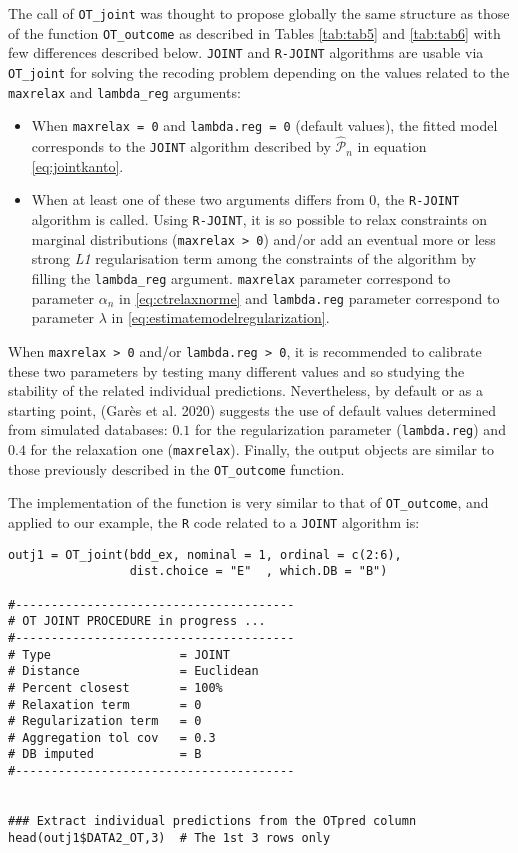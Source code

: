 The call of \texttt{OT\_joint} was thought to propose globally the same structure as those of the function \texttt{OT\_outcome} as described in Tables \ref{tab:tab5} and \ref{tab:tab6} with few differences described below. \texttt{JOINT} and \texttt{R-JOINT} algorithms are usable via \texttt{OT\_joint} for solving the recoding problem depending on the values related to the \texttt{maxrelax} and \texttt{lambda\_reg} arguments:

\begin{itemize}
\tightlist
\item
  When \texttt{maxrelax\ =\ 0} and \texttt{lambda.reg\ =\ 0} (default values), the fitted model corresponds to the \texttt{JOINT} algorithm described by \(\hat{\mathcal{P}}_n\) in equation \eqref{eq:jointkanto}.
\item
  When at least one of these two arguments differs from 0, the \texttt{R-JOINT} algorithm is called. Using \texttt{R-JOINT}, it is so possible to relax constraints on marginal distributions (\texttt{maxrelax\ \textgreater{}\ 0}) and/or add an eventual more or less strong \emph{L1} regularisation term among the constraints of the algorithm by filling the \texttt{lambda\_reg} argument. \texttt{maxrelax} parameter correspond to parameter \(\alpha_n\) in \eqref{eq:ctrelaxnorme} and \texttt{lambda.reg} parameter correspond to parameter \(\lambda\) in \eqref{eq:estimatemodelregularization}.
\end{itemize}

When \texttt{maxrelax\ \textgreater{}\ 0} and/or \texttt{lambda.reg\ \textgreater{}\ 0}, it is recommended to calibrate these two parameters by testing many different values and so studying the stability of the related individual predictions. Nevertheless, by default or as a starting point, (Garès et al. 2020) suggests the use of default values determined from simulated databases: \(0.1\) for the regularization parameter (\texttt{lambda.reg}) and \(0.4\) for the relaxation one (\texttt{maxrelax}). Finally, the output objects are similar to those previously described in the \texttt{OT\_outcome} function.

The implementation of the function is very similar to that of \texttt{OT\_outcome}, and applied to our example, the \texttt{R} code related to a \texttt{JOINT} algorithm is:

\begin{verbatim}
outj1 = OT_joint(bdd_ex, nominal = 1, ordinal = c(2:6), 
                 dist.choice = "E"  , which.DB = "B")

#---------------------------------------
# OT JOINT PROCEDURE in progress ...
#---------------------------------------
# Type                  = JOINT
# Distance              = Euclidean
# Percent closest       = 100%
# Relaxation term       = 0
# Regularization term   = 0
# Aggregation tol cov   = 0.3
# DB imputed            = B
#---------------------------------------


### Extract individual predictions from the OTpred column
head(outj1$DATA2_OT,3)  # The 1st 3 rows only
\end{verbatim}

